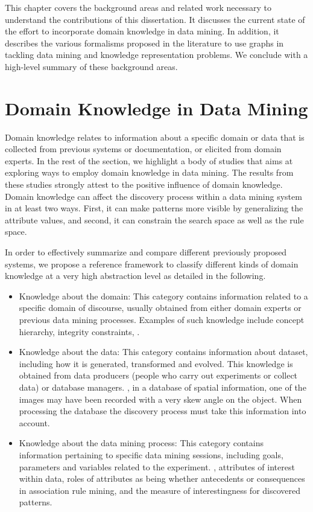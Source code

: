 This chapter covers the background areas and related work necessary to understand the contributions of this dissertation. It discusses the current state of the effort to incorporate domain knowledge in data mining. In addition, it describes the various formalisms proposed in the literature to use graphs in tackling data mining and knowledge representation problems. We conclude with a high-level summary of these background areas.

\section{Domain Knowledge in Data Mining}
Domain knowledge relates to information about a specific domain or data that is collected from previous systems or documentation, or elicited from domain experts. In the rest of the section, we highlight a body of studies that aims at exploring ways to employ domain knowledge in data mining. The results from these studies strongly attest to the positive influence of domain knowledge. Domain knowledge can affect the discovery process within a data mining system in at least two ways. First, it can make patterns more visible by generalizing the attribute values, and second, it can constrain the search space as well as the rule space.

In order to effectively summarize and compare different previously proposed systems, we propose a reference framework to classify different kinds of domain knowledge at a very high abstraction level as detailed in the following.

\begin{itemize}
\item	Knowledge about the domain: This category contains information related to a specific domain of discourse, usually obtained from either domain experts or previous data mining processes. Examples of such knowledge include concept hierarchy, integrity constraints, \etc.
\item	Knowledge about the data: This category contains information about dataset, including how it is generated, transformed and evolved. This knowledge is obtained from data producers (people who carry out experiments or collect data) or database managers. \eg, in a database of spatial information, one of the images may have been recorded with a very skew angle on the object. When processing the database the discovery process must take this information into account.
\item	Knowledge about the data mining process: This category contains information pertaining to specific data mining sessions, including goals, parameters and variables related to the experiment. \eg, attributes of interest within data, roles of attributes as being whether antecedents or consequences in association rule mining, and the measure of interestingness for discovered patterns.
\end{itemize}

